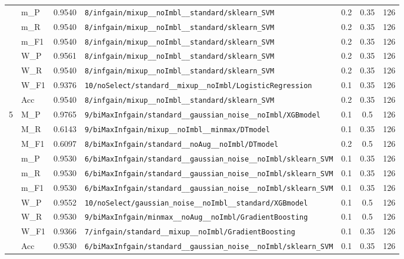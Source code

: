 \begin{table}[htbp]
\begin{tabular}{|c|l|c|>{\ttfamily\footnotesize}p{7.2cm}|c|c|c|}
 & m\_P & 0.9540 & \texttt{8/infgain/mixup\_\_noImbl\_\_standard/sklearn\_SVM} & 0.2 & 0.35  & 126 \\ 
 & m\_R & 0.9540 & \texttt{8/infgain/mixup\_\_noImbl\_\_standard/sklearn\_SVM} & 0.2 & 0.35  & 126 \\ 
 & m\_F1 & 0.9540 & \texttt{8/infgain/mixup\_\_noImbl\_\_standard/sklearn\_SVM} & 0.2 & 0.35  & 126 \\ 
 & W\_P & 0.9561 & \texttt{8/infgain/mixup\_\_noImbl\_\_standard/sklearn\_SVM} & 0.2 & 0.35  & 126 \\ 
 & W\_R & 0.9540 & \texttt{8/infgain/mixup\_\_noImbl\_\_standard/sklearn\_SVM} & 0.2 & 0.35  & 126 \\ 
 & W\_F1 & 0.9376 & \texttt{10/noSelect/standard\_\_mixup\_\_noImbl/LogisticRegression} & 0.1 & 0.35  & 126 \\ 
 & Acc & 0.9540 & \texttt{8/infgain/mixup\_\_noImbl\_\_standard/sklearn\_SVM} & 0.2 & 0.35  & 126 \\ 
\hline
\multirow{10}{*}{5} & M\_P & 0.9765 & \texttt{9/biMaxInfgain/standard\_\_gaussian\_noise\_\_noImbl/XGBmodel} & 0.1 & 0.5  & 126 \\ 
 & M\_R & 0.6143 & \texttt{9/biMaxInfgain/mixup\_\_noImbl\_\_minmax/DTmodel} & 0.1 & 0.35  & 126 \\ 
 & M\_F1 & 0.6097 & \texttt{8/biMaxInfgain/standard\_\_noAug\_\_noImbl/DTmodel} & 0.2 & 0.5  & 126 \\ 
 & m\_P & 0.9530 & \texttt{6/biMaxInfgain/standard\_\_gaussian\_noise\_\_noImbl/sklearn\_SVM} & 0.1 & 0.35  & 126 \\ 
 & m\_R & 0.9530 & \texttt{6/biMaxInfgain/standard\_\_gaussian\_noise\_\_noImbl/sklearn\_SVM} & 0.1 & 0.35  & 126 \\ 
 & m\_F1 & 0.9530 & \texttt{6/biMaxInfgain/standard\_\_gaussian\_noise\_\_noImbl/sklearn\_SVM} & 0.1 & 0.35  & 126 \\ 
 & W\_P & 0.9552 & \texttt{10/noSelect/gaussian\_noise\_\_noImbl\_\_standard/XGBmodel} & 0.1 & 0.5  & 126 \\ 
 & W\_R & 0.9530 & \texttt{9/biMaxInfgain/minmax\_\_noAug\_\_noImbl/GradientBoosting} & 0.1 & 0.5  & 126 \\ 
 & W\_F1 & 0.9366 & \texttt{7/infgain/standard\_\_mixup\_\_noImbl/GradientBoosting} & 0.1 & 0.35  & 126 \\ 
 & Acc & 0.9530 & \texttt{6/biMaxInfgain/standard\_\_gaussian\_noise\_\_noImbl/sklearn\_SVM} & 0.1 & 0.35  & 126 \\ 
\hline
\end{tabular}
\end{table}